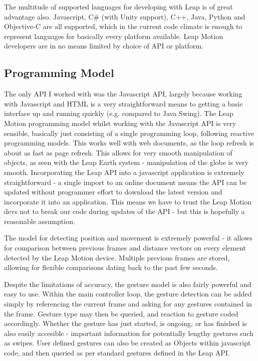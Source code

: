 \documentclass{sigplanconf}
\begin{document}
The multitude of supported languages for developing with Leap is of great advantage also. Javascript, C\# (with Unity support), C++, Java, Python and Objective-C are all supported, which in the current code climate is enough to represent languages for basically every platform available. Leap Motion developers are in no means limited by choice of API or platform.

\subsection{Programming Model}

The only API I worked with was the Javascript API, largely because working with Javascript and HTML is a very straightforward means to getting a basic interface up and running quickly (e.g. compared to Java Swing). The Leap Motion programming model whilst working with the Javascript API is very sensible, basically just consisting of a single programming loop, following reactive programming models. This works well with web documents, as the loop refresh is about as fast as page refresh. This allows for very smooth manipulation of objects, as seen with the Leap Earth system - manipulation of the globe is very smooth. Incorporating the Leap API into a javascript application is extremely straightforward - a single import to an online document means the API can be updated without programmer effort to download the latest version and incorporate it into an application. This means we have to trust the Leap Motion devs not to break our code during updates of the API - but this is hopefully a reasonable assumption. 

The model for detecting position and movement is extremely powerful - it allows for comparison between previous frames and distance vectors on every element detected by the Leap Motion device. Multiple previous frames are stored, allowing for flexible comparisons dating back to the past few seconds. 

Despite the limitations of accuracy, the gesture model is also fairly powerful and easy to use. Within the main controller loop, the gesture detection can be added simply by referencing the current frame and asking for any gestures contained in the frame. Gesture type may then be queried, and reaction to gesture coded accordingly. Whether the gesture has just started, is ongoing, or has finished is also easily accesible - important information for potentially lengthy gestures such as swipes. User defined gestures can also be created as Objects within javascript code, and then queried as per standard gestures defined in the Leap API. 
\end{document}

